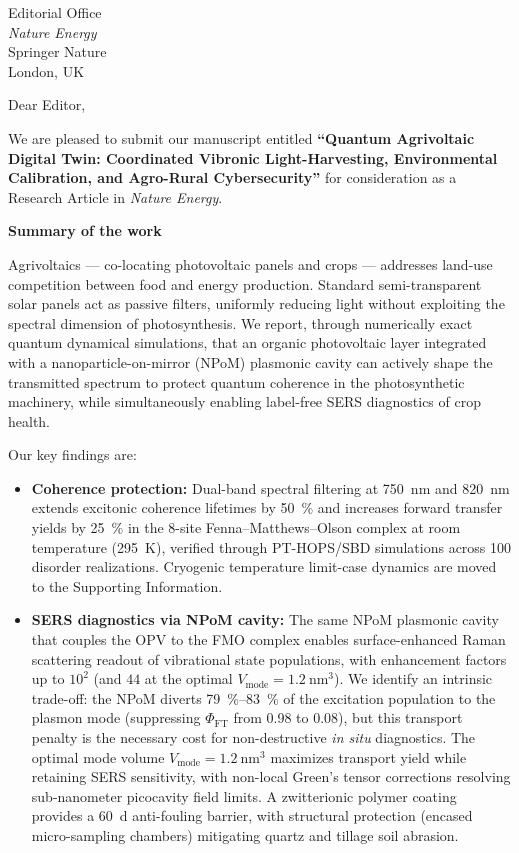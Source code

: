 \documentclass[12pt]{letter}
\begin{document}
\begin{letter}{Editorial Office\\
\textit{Nature Energy}\\
Springer Nature\\
London, UK}

\opening{Dear Editor,}

We are pleased to submit our manuscript entitled \textbf{``Quantum Agrivoltaic Digital Twin: Coordinated Vibronic Light-Harvesting, Environmental Calibration, and Agro-Rural Cybersecurity''} for consideration as a Research Article in \textit{Nature Energy}.

\noindent\textbf{Summary of the work}

Agrivoltaics --- co-locating photovoltaic panels and crops --- addresses land-use competition between food and energy production. Standard semi-transparent solar panels act as passive filters, uniformly reducing light without exploiting the spectral dimension of photosynthesis. We report, through numerically exact quantum dynamical simulations, that an organic photovoltaic layer integrated with a nanoparticle-on-mirror (NPoM) plasmonic cavity can actively shape the transmitted spectrum to protect quantum coherence in the photosynthetic machinery, while simultaneously enabling label-free SERS diagnostics of crop health.

Our key findings are:

\begin{itemize}
\item \textbf{Coherence protection:} Dual-band spectral filtering at \qty{750}{\nm} and \qty{820}{\nm} extends excitonic coherence lifetimes by \qty{50}{\percent} and increases forward transfer yields by \qty{25}{\percent} in the 8-site Fenna--Matthews--Olson complex at room temperature (\qty{295}{\kelvin}), verified through PT-HOPS/SBD simulations across 100 disorder realizations. Cryogenic temperature limit-case dynamics are moved to the Supporting Information.

\item \textbf{SERS diagnostics via NPoM cavity:} The same NPoM plasmonic cavity that couples the OPV to the FMO complex enables surface-enhanced Raman scattering readout of vibrational state populations, with enhancement factors up to $10^2$ (and $44$ at the optimal $V_{\mathrm{mode}} = \qty{1.2}{\nm\cubed}$). We identify an intrinsic trade-off: the NPoM diverts \qty{79}{\percent}{--}\qty{83}{\percent} of the excitation population to the plasmon mode (suppressing $\Phi_{\mathrm{FT}}$ from 0.98 to 0.08), but this transport penalty is the necessary cost for non-destructive \emph{in situ} diagnostics. The optimal mode volume $V_{\mathrm{mode}} = \qty{1.2}{\nm\cubed}$ maximizes transport yield while retaining SERS sensitivity, with non-local Green's tensor corrections resolving sub-nanometer picocavity field limits. A zwitterionic polymer coating provides a \qty{60}{\day} anti-fouling barrier, with structural protection (encased micro-sampling chambers) mitigating quartz and tillage soil abrasion.


\end{itemize}
\end{letter}
\end{document}
